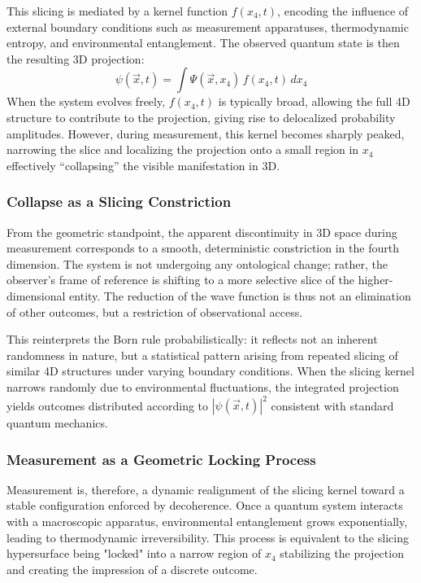 \documentclass[12pt]{article}
\begin{document}
This slicing is mediated by a kernel function $f(x_4, t)$, encoding the influence of external boundary conditions such as measurement apparatuses, thermodynamic entropy, and environmental entanglement. The observed quantum state is then the resulting 3D projection:
\begin{equation}
\psi(\vec{x}, t) = \int \Psi(\vec{x}, x_4) \, f(x_4, t) \, dx_4
\end{equation}
When the system evolves freely, $f(x_4, t)$ is typically broad, allowing the full 4D structure to contribute to the projection, giving rise to delocalized probability amplitudes. However, during measurement, this kernel becomes sharply peaked, narrowing the slice and localizing the projection onto a small region in $x_4$ effectively “collapsing” the visible manifestation in 3D.

\subsubsection*{Collapse as a Slicing Constriction}

From the geometric standpoint, the apparent discontinuity in 3D space during measurement corresponds to a smooth, deterministic constriction in the fourth dimension. The system is not undergoing any ontological change; rather, the observer's frame of reference is shifting to a more selective slice of the higher-dimensional entity. The reduction of the wave function is thus not an elimination of other outcomes, but a restriction of observational access.

This reinterprets the Born rule probabilistically: it reflects not an inherent randomness in nature, but a statistical pattern arising from repeated slicing of similar 4D structures under varying boundary conditions. When the slicing kernel narrows randomly due to environmental fluctuations, the integrated projection yields outcomes distributed according to $|\psi(\vec{x}, t)|^2$ consistent with standard quantum mechanics.

\subsubsection*{Measurement as a Geometric Locking Process}

Measurement is, therefore, a dynamic realignment of the slicing kernel toward a stable configuration enforced by decoherence. Once a quantum system interacts with a macroscopic apparatus, environmental entanglement grows exponentially, leading to thermodynamic irreversibility. This process is equivalent to the slicing hypersurface being "locked" into a narrow region of $x_4$ stabilizing the projection and creating the impression of a discrete outcome.
\end{document}
